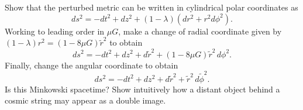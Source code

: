 Show that the perturbed metric can be written in cylindrical polar coordinates as
\begin{equation}
    ds^2 = -dt^2 + dz^2 + (1-\lambda)(dr^2 + r^2 d\phi^2).
\end{equation}
Working to leading order in $\mu G$, make a change of radial coordinate given by $(1-\lambda)r^2 = (1-8\mu G)\tilde r^2$ to obtain
\begin{equation}
    ds^2 = -dt^2 + dz^2 + d\tilde r^2 + (1-8\mu G)\tilde r^2\,d\phi^2.
\end{equation}
Finally, change the angular coordinate to obtain
\begin{equation}
    ds^2 = -dt^2 + dz^2 + d\tilde r^2 + \tilde r^2\,d\tilde\phi^2.
\end{equation}
Is this Minkowski spacetime? Show intuitively how a distant object behind a cosmic string may appear as a double image.
